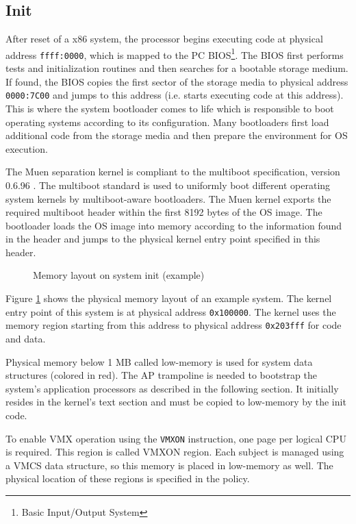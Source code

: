 \subsection{Init}\label{subsec:init}
After reset of a x86 system, the processor begins executing code at physical
address \texttt{ffff:0000}, which is mapped to the PC
BIOS\footnote{Basic Input/Output System}. The BIOS first performs
tests and initialization routines and then searches for a bootable storage
medium. If found, the BIOS copies the first sector of the storage media to
physical address \texttt{0000:7C00} and jumps to this address (i.e. starts
executing code at this address). This is where the system bootloader comes to
life which is responsible to boot operating systems according to its
configuration. Many bootloaders first load additional code from the storage
media and then prepare the environment for OS execution.

The Muen separation kernel is compliant to the multiboot specification, version
0.6.96 \cite{multiboot}. The multiboot standard is used to uniformly boot
different operating system kernels by multiboot-aware bootloaders.
The Muen kernel exports the required multiboot header within the first 8192
bytes of the OS image. The bootloader loads the OS image into memory according
to the information found in the header and jumps to the physical kernel entry
point specified in this header.

\begin{figure}[h]
	\centering
	
	\caption{Memory layout on system init (example)}
	\label{fig:init-mem-layout-example}
\end{figure}

Figure \ref{fig:init-mem-layout-example} shows the physical memory layout of an
example system. The kernel entry point of this system is at physical address
\texttt{0x100000}. The kernel uses the memory region starting from this address
to physical address \texttt{0x203fff} for code and data.

Physical memory below 1 MB called low-memory is used for system data structures
(colored in red). The AP trampoline is needed to
bootstrap the system's application processors as described in the following
section. It initially resides in the kernel's text section and must be copied to
low-memory by the init code.

To enable VMX operation using the \texttt{VMXON} instruction, one page per
logical CPU is required. This region is called VMXON region. Each
subject is managed using a VMCS data structure, so this memory is
placed in low-memory as well. The physical location of these regions is
specified in the policy.

